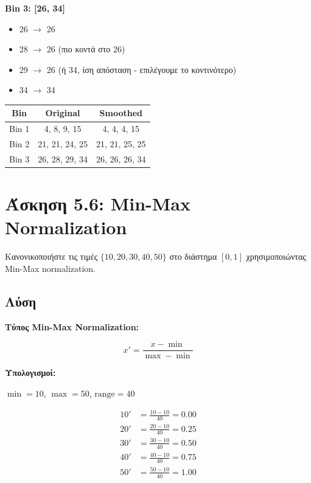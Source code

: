 \textbf{Bin 3: [26, 34]}
\begin{itemize}
    \item 26 $\to$ 26
    \item 28 $\to$ 26 (πιο κοντά στο 26)
    \item 29 $\to$ 26 (ή 34, ίση απόσταση - επιλέγουμε το κοντινότερο)
    \item 34 $\to$ 34
\end{itemize}

\begin{center}
\begin{tabular}{ccc}
\toprule
\textbf{Bin} & \textbf{Original} & \textbf{Smoothed} \\
\midrule
Bin 1 & 4, 8, 9, 15 & 4, 4, 4, 15 \\
Bin 2 & 21, 21, 24, 25 & 21, 21, 25, 25 \\
Bin 3 & 26, 28, 29, 34 & 26, 26, 26, 34 \\
\bottomrule
\end{tabular}
\end{center}

\section{Άσκηση 5.6: Min-Max Normalization}

\begin{formulabox}[Εκφώνηση]
Κανονικοποιήστε τις τιμές $\{10, 20, 30, 40, 50\}$ στο διάστημα $[0, 1]$
χρησιμοποιώντας Min-Max normalization.
\end{formulabox}

\subsection*{Λύση}

\textbf{Τύπος Min-Max Normalization:}

$$x' = \frac{x - \min}{\max - \min}$$

\textbf{Υπολογισμοί:}

$\min = 10$, $\max = 50$, $\text{range} = 40$

\begin{align*}
10' &= \frac{10 - 10}{40} = 0.00 \\
20' &= \frac{20 - 10}{40} = 0.25 \\
30' &= \frac{30 - 10}{40} = 0.50 \\
40' &= \frac{40 - 10}{40} = 0.75 \\
50' &= \frac{50 - 10}{40} = 1.00
\end{align*}

